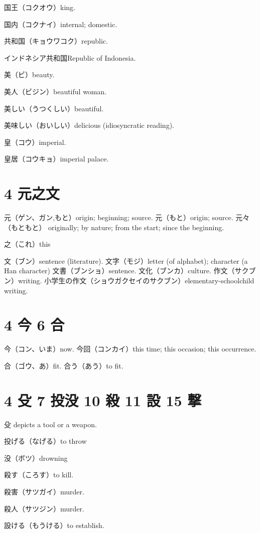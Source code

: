 国王（コクオウ）king.

国内（コクナイ）internal; domestic.

共和国（キョウワコク）republic.

インドネシア共和国Republic of Indonesia.

美（ビ）beauty.

美人（ビジン）beautiful woman.

美しい（うつくしい）beautiful.

美味しい（おいしい）delicious (idiosyncratic reading).

皇（コウ）imperial.

皇居（コウキョ）imperial palace.

\section{4 元之文}

元（ゲン、ガン,もと）origin; beginning; source.
元（もと）origin; source.
元々（もともと）
originally; by nature; from the start; since the beginning.

之（これ）this

文（ブン）sentence (literature).
文字（モジ）letter (of alphabet); character (a Han character)
文書（ブンショ）sentence.
文化（ブンカ）culture.
作文（サクブン）writing.
小学生の作文（ショウガクセイのサクブン）elementary-schoolchild writing.

\section{4 今 6 合}

今（コン、いま）now.
今回（コンカイ）this time; this occasion; this occurrence.

合（ゴウ、あ）fit.
合う（あう）to fit.

\section{4 殳 7 投没 10 殺 11 設 15 撃}

殳 depicts a tool or a weapon.

投げる（なげる）to throw

没（ボツ）drowning

殺す（ころす）to kill.

殺害（サツガイ）murder.

殺人（サツジン）murder.

設ける（もうける）to establish.

